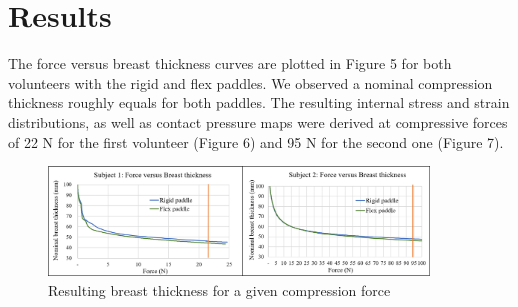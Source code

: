 \section{Results}\label{section:breastcompressionevaluation}
The force versus breast thickness curves are plotted in Figure 5 for both volunteers with the rigid and flex paddles. We observed a nominal compression thickness roughly equals for both paddles. The resulting internal stress and strain distributions, as well as contact pressure maps were derived at compressive forces of 22 N for the first volunteer (Figure 6) and 95 N for the second one (Figure 7).

\begin{figure}[!h]
\centering
\includegraphics[width=0.9\textwidth,keepaspectratio]{figures/forceThicknessResults.png} 
\caption{Resulting breast thickness for a given compression force}\label{fig:forceThicknessResults}
\end{figure}

